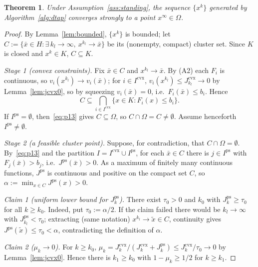 \documentclass[]{interact}
\theoremstyle{plain}
\newtheorem{theorem}{Theorem}[section]
\theoremstyle{definition}
\theoremstyle{remark}
\newcommand{\cvx}{\mathrm{cvx}}
\newcommand{\ps}{\mathrm{ps}}
\begin{document}
\begin{theorem}\label{thm:strong}
Under Assumption~\ref{ass:standing}, the sequence $\{x^k\}$ generated by Algorithm~\ref{alg:dtap} converges strongly to a point $x^\infty\in\Omega$.
\end{theorem}
\begin{proof}
By Lemma~\ref{lem:bounded}, $\{x^k\}$ is bounded; let $C:=\{\bar x\in H:\exists\,k_l\to\infty,\ x^{k_l}\to\bar x\}$ be its (nonempty, compact) cluster set. Since $K$ is closed and $x^k\in K$, $C\subseteq K$.

\emph{Stage 1 (convex constraints).} Fix $\bar x\in C$ and $x^{k_l}\to\bar x$. By (A2) each $F_i$ is continuous, so $v_i(x^{k_l})\to v_i(\bar x)$; for $i\in I^{\cvx}$, $v_i(x^{k_l})\le J^{\cvx}_{k_l}\to0$ by Lemma~\ref{lem:jcvx0}, so by squeezing $v_i(\bar x)=0$, i.e.\ $F_i(\bar x)\le b_i$. Hence
\begin{equation}\label{eq:p13}
C\subseteq\bigcap_{i\in I^{\cvx}}\{x\in K:F_i(x)\le b_i\}.
\end{equation}
If $I^{\ps}=\emptyset$, then~\eqref{eq:p13} gives $C\subseteq\Omega$, so $C\cap\Omega=C\ne\emptyset$. Assume henceforth $I^{\ps}\ne\emptyset$.

\emph{Stage 2 (a feasible cluster point).} Suppose, for contradiction, that $C\cap\Omega=\emptyset$. By~\eqref{eq:p13} and the partition $I=I^{\cvx}\cup I^{\ps}$, for each $\bar x\in C$ there is $j\in I^{\ps}$ with $F_j(\bar x)>b_j$, i.e.\ $J^{\ps}(\bar x)>0$. As a maximum of finitely many continuous functions, $J^{\ps}$ is continuous and positive on the compact set $C$, so $\alpha:=\min_{x\in C}J^{\ps}(x)>0$.

\smallskip
\emph{Claim 1 (uniform lower bound for $J^{\ps}_k$).} There exist $\tau_0>0$ and $k_0$ with $J^{\ps}_k\ge\tau_0$ for all $k\ge k_0$. Indeed, put $\tau_0:=\alpha/2$. If the claim failed there would be $k_l\to\infty$ with $J^{\ps}_{k_l}<\tau_0$; extracting (same notation) $x^{k_l}\to\tilde x\in C$, continuity gives $J^{\ps}(\tilde x)\le\tau_0<\alpha$, contradicting the definition of $\alpha$.

\smallskip
\emph{Claim 2 ($\mu_k\to0$).} For $k\ge k_0$, $\mu_k=J^{\cvx}_k/(J^{\cvx}_k+J^{\ps}_k)\le J^{\cvx}_k/\tau_0\to0$ by Lemma~\ref{lem:jcvx0}. Hence there is $k_1\ge k_0$ with $1-\mu_k\ge1/2$ for $k\ge k_1$.


\end{proof}
\end{document}
